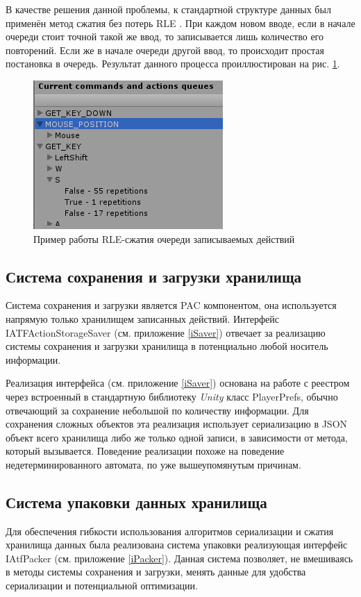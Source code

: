 В качестве решения данной проблемы, к стандартной структуре данных был применён метод сжатия без потерь RLE \cite{rle}. При каждом новом вводе, если в начале очереди стоит точной такой же ввод, то записывается лишь количество его повторений. Если же в начале очереди другой ввод, то происходит простая постановка в очередь. Результат данного процесса проиллюстирован на рис. \ref{storageContains}.

\begin{figure}[h]
	\centering
	\includegraphics[width=0.5\linewidth]{storageContains.png}
	\caption{Пример работы RLE-сжатия очереди записываемых действий}
	\label{storageContains}
\end{figure}

\subsection{Система сохранения и загрузки хранилища}
Система сохранения и загрузки является PAC компонентом, она используется напрямую только хранилищем записанных действий. Интерфейс IATFActionStorageSaver (см. приложение \ref{iSaver}) отвечает за реализацию системы сохранения и загрузки хранилища в потенциально любой носитель информации.

Реализация интерфейса (см. приложение \ref{iSaver}) основана на работе с реестром через встроенный в стандартную библиотеку \textit{Unity} класс PlayerPrefs, обычно отвечающий за сохранение небольшой по количеству информации. Для сохранения сложных объектов эта реализация использует сериализацию в JSON объект всего хранилища либо же только одной записи, в зависимости от метода, который вызывается. Поведение реализации похоже на поведение недетерминированного автомата, по уже вышеупомянутым причинам.

\subsection{Система упаковки данных хранилища}
Для обеспечения гибкости использования алгоритмов сериализации и сжатия хранилища данных была реализована система упаковки реализующая интерфейс IAtfPacker (см. приложение \ref{iPacker}). Данная система позволяет, не вмешиваясь в методы системы сохранения и загрузки, менять данные для удобства сериализации и потенциальной оптимизации.

